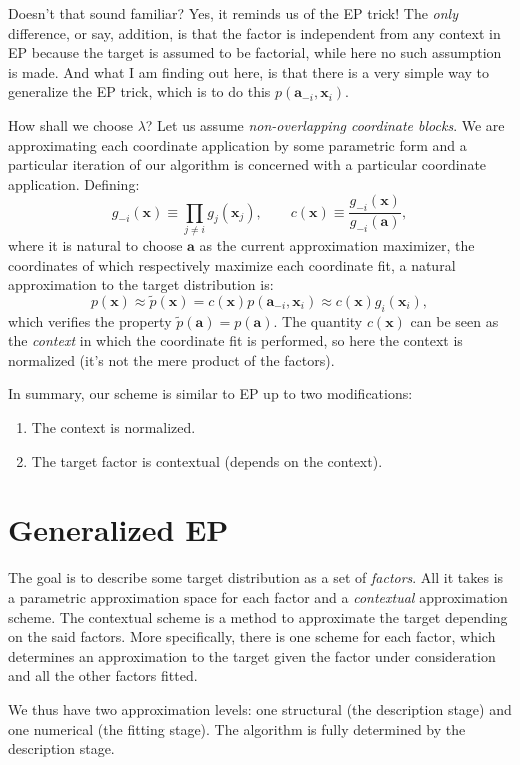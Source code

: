 \documentclass{article}
\def\x{{\mathbf{x}}}
\def\a{{\mathbf{a}}}
\begin{document}
Doesn't that sound familiar? Yes, it reminds us of the EP trick! The {\em only} difference, or say, addition, is that the factor is independent from any context in EP because the target is assumed to be factorial, while here no such assumption is made. And what I am finding out here, is that there is a very simple way to generalize the EP trick, which is to do this $p(\a_{-i}, \x_i)$.

How shall we choose $\lambda$? Let us assume {\em non-overlapping coordinate blocks}. We are approximating each coordinate application by some parametric form and a particular iteration of our algorithm is concerned with a particular coordinate application. Defining:
$$
g_{-i}(\x)\equiv \prod_{j\not=i} g_j(\x_j),
\qquad
c(\x) \equiv \frac{g_{-i}(\x)}{g_{-i}(\a)},
$$
where it is natural to choose $\a$ as the current approximation maximizer, the coordinates of which respectively maximize each coordinate fit, a natural approximation to the target distribution is:
$$
p(\x)
\approx
\tilde {p}(\x)
= c(\x) p(\a_{-i},\x_i)
\approx c(\x) g_i(\x_i),
$$
which verifies the property $\tilde{p}(\a)=p(\a)$. The quantity $c(\x)$ can be seen as the {\em context} in which the coordinate fit is performed, so here the context is normalized (it's not the mere product of the factors).

In summary, our scheme is similar to EP up to two modifications:
\begin{enumerate}
     \item The context is normalized.
     \item The target factor is contextual (depends on the context). 
\end{enumerate}


\section{Generalized EP}

The goal is to describe some target distribution as a set of {\em factors}. All it takes is a parametric approximation space for each factor and a {\em contextual} approximation scheme. The contextual scheme is a method to approximate the target depending on the said factors. More specifically, there is one scheme for each factor, which determines an approximation to the target given the factor under consideration and all the other factors fitted.

We thus have two approximation levels: one structural (the description stage) and one numerical (the fitting stage). The algorithm is fully determined by the description stage.
\end{document}
